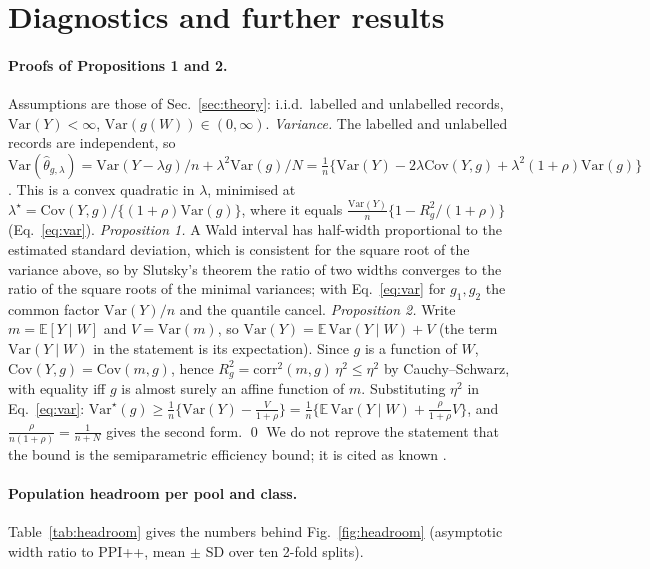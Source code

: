 \section{Diagnostics and further results}
\label{app:diag}
\paragraph{Proofs of Propositions 1 and 2.}
Assumptions are those of Sec.~\ref{sec:theory}: i.i.d.\ labelled and unlabelled records, $\mathrm{Var}(Y)<\infty$, $\mathrm{Var}(g(W))\in(0,\infty)$.
\emph{Variance.} The labelled and unlabelled records are independent, so
$\mathrm{Var}(\hat\theta_{g,\lambda})=\mathrm{Var}(Y-\lambda g)/n+\lambda^2\mathrm{Var}(g)/N
=\tfrac1n\{\mathrm{Var}(Y)-2\lambda\mathrm{Cov}(Y,g)+\lambda^2(1+\rho)\mathrm{Var}(g)\}$.
This is a convex quadratic in $\lambda$, minimised at $\lambda^\star=\mathrm{Cov}(Y,g)/\{(1+\rho)\mathrm{Var}(g)\}$, where it equals $\tfrac{\mathrm{Var}(Y)}n\{1-R_g^2/(1+\rho)\}$ (Eq.~\ref{eq:var}).
\emph{Proposition 1.} A Wald interval has half-width proportional to the estimated standard deviation, which is consistent for the square root of the variance above, so by Slutsky's theorem the ratio of two widths converges to the ratio of the square roots of the minimal variances; with Eq.~\eqref{eq:var} for $g_1,g_2$ the common factor $\mathrm{Var}(Y)/n$ and the quantile cancel.
\emph{Proposition 2.} Write $m=\mathbb E[Y\mid W]$ and $V=\mathrm{Var}(m)$, so $\mathrm{Var}(Y)=\mathbb E\,\mathrm{Var}(Y\mid W)+V$ (the term $\mathrm{Var}(Y\mid W)$ in the statement is its expectation). Since $g$ is a function of $W$, $\mathrm{Cov}(Y,g)=\mathrm{Cov}(m,g)$, hence $R_g^2=\mathrm{corr}^2(m,g)\,\eta^2\le\eta^2$ by Cauchy--Schwarz, with equality iff $g$ is almost surely an affine function of $m$.
Substituting $\eta^2$ in Eq.~\eqref{eq:var}: $\mathrm{Var}^\star(g)\ge\tfrac1n\{\mathrm{Var}(Y)-\tfrac{V}{1+\rho}\}=\tfrac1n\{\mathbb E\,\mathrm{Var}(Y\mid W)+\tfrac{\rho}{1+\rho}V\}$, and $\tfrac{\rho}{n(1+\rho)}=\tfrac1{n+N}$ gives the second form. \qed
We do not reprove the statement that the bound is the semiparametric efficiency bound; it is cited as known \citep{angelopoulos2023ppiplus}.

\paragraph{Population headroom per pool and class.}
Table~\ref{tab:headroom} gives the numbers behind Fig.~\ref{fig:headroom} (asymptotic width ratio to PPI++, mean $\pm$ SD over ten 2-fold splits).

